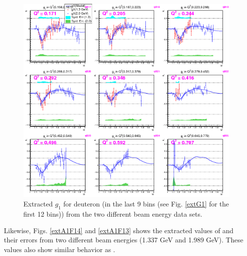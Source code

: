 \begin{figure}[H] %
  \leavevmode \includegraphics[width=1.0\textwidth]{figuresEG4/FigResults/extractedFrmBothEb_G1_C71S181NoQeWbins70LessQ2binsNwPd3.png} 
  \caption[Extracted $g_{1}$ in the next 9 \qsqs bins]{Extracted $g_{1}$ for deuteron (in the last 9 \qsqs bins (see Fig. \ref{extG1} for the first 12 bins)) from the two different beam energy data sets.}
  \label{extG13}  %
\end{figure}


Likewise, Figs. \ref{extA1F14} and \ref{extA1F13} shows the extracted values of \afones and their errors from two different beam energies (1.337 GeV and 1.989 GeV).%
These values also show similar behavior as \gone. %

